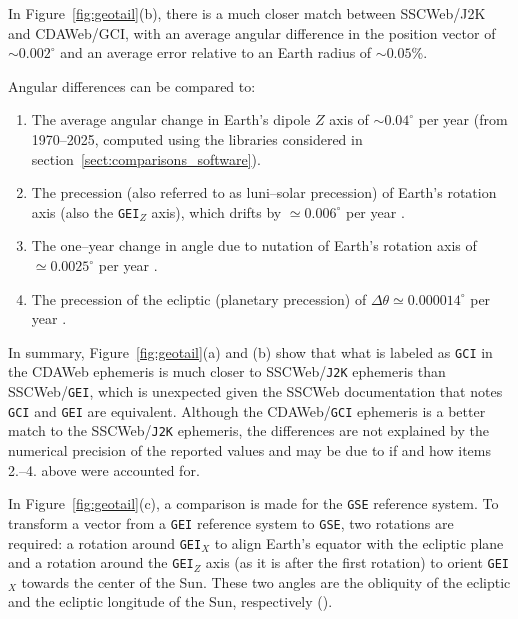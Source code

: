 \documentclass[draft]{agujournal2019}
\begin{document}
In Figure~\ref{fig:geotail}(b), there is a much closer match between SSCWeb/J2K and CDAWeb/GCI, with an average angular difference in the position vector of ${\sim}0.002^\circ$ and an average error relative to an Earth radius of ${\sim}0.05$\%. 

Angular differences can be compared to:
\begin{enumerate}

    \item The average angular change in Earth's dipole $Z$ axis of ${\sim} 0.04^\circ$ per year (from 1970--2025, computed using the libraries considered in section~\ref{sect:comparisons_software}).

    \item The precession (also referred to as luni--solar precession) of Earth's rotation axis (also the \texttt{GEI}$_Z$ axis), which drifts by $\simeq 0.006^\circ$ per year \cite{Hapgood1995}.

    \item The one--year change in angle due to nutation of Earth's rotation axis of $\simeq 0.0025^\circ$ per year \cite{Hapgood1995}.
    
    \item The precession of the ecliptic (planetary precession) of $\Delta \theta \simeq 0.000014^\circ$ per year \cite{Hapgood1995}.
\end{enumerate}

In summary, Figure~\ref{fig:geotail}(a) and (b) show that what is labeled as \texttt{GCI} in the CDAWeb ephemeris is much closer to SSCWeb/\texttt{J2K} ephemeris than SSCWeb/\texttt{GEI}, which is unexpected given the SSCWeb documentation that notes \texttt{GCI} and \texttt{GEI} are equivalent. Although the CDAWeb/\texttt{GCI} ephemeris is a better match to the SSCWeb/\texttt{J2K} ephemeris, the differences are not explained by the numerical precision of the reported values and may be due to if and how items 2.--4. above were accounted for.

In Figure~\ref{fig:geotail}(c), a comparison is made for the \texttt{GSE} reference system. To transform a vector from a \texttt{GEI} reference system to \texttt{GSE}, two rotations are required: a rotation around \texttt{GEI}$_X$ to align Earth's equator with the ecliptic plane and a rotation around the \texttt{GEI}$_Z$ axis (as it is after the first rotation) to orient \texttt{GEI}$_X$ towards the center of the Sun. These two angles are the obliquity of the ecliptic and the ecliptic longitude of the Sun, respectively ().
\end{document}
